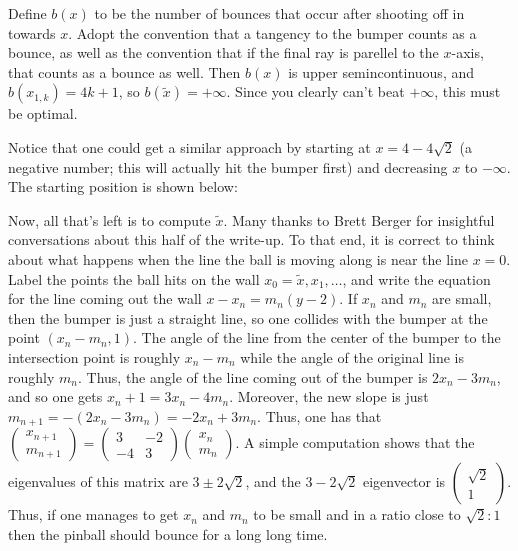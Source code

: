\documentclass[11pt]{article}
\theoremstyle{definition}
\begin{document}
Define $b(x)$ to be the number of bounces that occur after shooting off in towards $x$.  Adopt the convention that a tangency to the bumper counts as a bounce, as well as the convention that if the final ray is parellel to the $x$-axis, that counts as a bounce as well.  Then $b(x)$ is upper semincontinuous, and $b(x_{1, k}) = 4k+1$, so $b(\tilde{x}) = +\infty$.  Since you clearly can't beat $+\infty$, this must be optimal.

Notice that one could get a similar approach by starting at $x = 4-4\sqrt{2}$ (a negative number; this will actually hit the bumper first) and decreasing $x$ to $-\infty$.  The starting position is shown below:


Now, all that's left is to compute $\tilde{x}$.  Many thanks to Brett Berger for insightful conversations about this half of the write-up.  To that end, it is correct to think about what happens when the line the ball is moving along is near the line $x = 0$.  Label the points the ball hits on the wall $x_0 = \tilde{x}, x_1, \ldots$, and write the equation for the line coming out the wall $x-x_n = m_n(y-2)$.  If $x_n$ and $m_n$ are small, then the bumper is just a straight line, so one collides with the bumper at the point $(x_n-m_n, 1)$.  The angle of the line from the center of the bumper to the intersection point is roughly $x_n-m_n$ while the angle of the original line is roughly $m_n$.  Thus, the angle of the line coming out of the bumper is $2x_n-3m_n$, and so one gets $x_n+1 = 3x_n - 4m_n$.  Moreover, the new slope is just $m_{n+1} = -(2x_n - 3m_n) = -2x_n + 3m_n$.  Thus, one has that $\left(\begin{smallmatrix}x_{n+1} \\ m_{n+1}\end{smallmatrix}\right) = \left(\begin{smallmatrix} 3 & -2 \\ -4 & 3\end{smallmatrix}\right)\left(\begin{smallmatrix}x_n \\ m_n\end{smallmatrix}\right)$.  A simple computation shows that the eigenvalues of this matrix are $3\pm2\sqrt{2}$, and the $3-2\sqrt{2}$ eigenvector is $\left(\begin{smallmatrix}\sqrt{2} \\ 1\end{smallmatrix}\right)$.  Thus, if one manages to get $x_n$ and $m_n$ to be small and in a ratio close to $\sqrt{2}:1$ then the pinball should bounce for a long long time.
\end{document}
